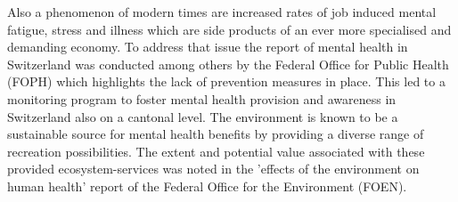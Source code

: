 \newline
Also a phenomenon of modern times are increased rates of job induced mental fatigue, stress and illness which are side products of an ever more specialised and demanding economy. To address that issue the report of mental health in Switzerland \parencite{Ruesch2003} was conducted among others by the Federal Office for Public Health (FOPH) which highlights the lack of prevention measures in place. This led to a monitoring program to foster mental health provision and awareness in Switzerland \parencite{Schuler2012} also on a cantonal level. The environment is known to be a sustainable source for mental health benefits by providing a diverse range of recreation possibilities. The extent and potential value associated with these provided ecosystem-services was noted in the 'effects of the environment on human health' report \parencite{Ragettli2017} of the Federal Office for the Environment (FOEN). \\


